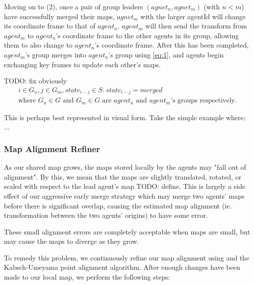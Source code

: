 Moving on to (2), once a pair of group leaders $(agnet_n, agnet_m)$ (with $n<m$) have successfully merged their maps, $agnet_m$ with the larger agentId will change its coordinate frame to that of $agent_n$. $agent_m$ will then send the transform from $agent_m$ to $agent_n$'s coordinate frame to the other agents in its group, allowing them to also change to $agent_n$'s coordinate frame. After this has been completed, $agent_m$'s group merges into $agent_n$'s group using \autoref{eq:1}, and agents begin exchanging key frames to update each other's maps.

TODO: fix obviously
\begin{gather} \label{eq:1}
    i \in G_n, j \in G_m, state_{i-j} \in S.\ state_{i-j} = merged\\ \text{where $G_n \in G$ and $G_m \in G$ are $agent_n$ and $agent_m$'s groups respectively.}
\end{gather}

This is perhaps best represented in visual form. Take the simple example where: ...



\subsubsection{Map Alignment Refiner}
\label{sec:map-alignment-refiner}
As our shared map grows, the maps stored locally by the agents may "fall out of alignment". By this, we mean that the maps are slightly translated, rotated, or scaled with respect to the lead agent's map TODO: define. This is largely a side effect of our aggressive early merge strategy which may merge two agents' maps before there is significant overlap, causing the estimated map alignment (ie. transformation between the two agents' origins) to have some error.

These small alignment errors are completely acceptable when maps are small, but may cause the maps to diverge as they grow.

To remedy this problem, we continuously refine our map alignment using  and the Kabsch-Umeyama point alignment algorithm. After enough changes have been made to our local map, we perform the following steps:


